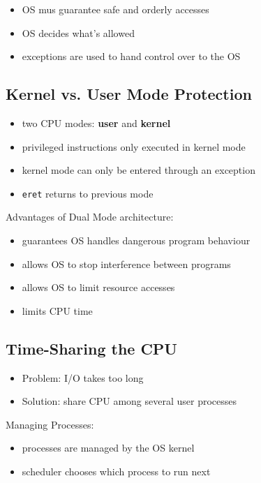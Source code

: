 \documentclass{article}
\newcommand{\T}[1]{\texttt{#1}}
\begin{document}
\begin{itemize}
	\item OS mus guarantee safe and orderly accesses
	\item OS decides what's allowed
	\item exceptions are used to hand control over to the OS
\end{itemize}

\subsection{Kernel vs. User Mode Protection}

\begin{itemize}
	\item two CPU modes: \textbf{user} and \textbf{kernel}
	\item privileged instructions only executed in kernel mode
	\item kernel mode can only be entered through an exception
	\item \T{eret} returns to previous mode
\end{itemize}

Advantages of Dual Mode architecture:
\begin{itemize}
	\item guarantees OS handles dangerous program behaviour
	\item allows OS to stop interference between programs
	\item allows OS to limit resource accesses
	\item limits CPU time
\end{itemize}

\subsection{Time-Sharing the CPU}

\begin{itemize}
	\item Problem: I/O takes too long
	\item Solution: share CPU among several user processes
\end{itemize}

Managing Processes:
\begin{itemize}
	\item processes are managed by the OS kernel
	\item scheduler chooses which process to run next
\end{itemize}
\end{document}
